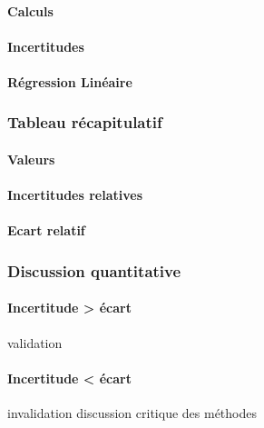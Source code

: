 \paragraph{Calculs}
\paragraph{Incertitudes}
\paragraph{Régression Linéaire}
\newpage

\subsubsection{\large Tableau récapitulatif}
\paragraph{Valeurs}
\paragraph{Incertitudes relatives}
\paragraph{Ecart relatif}

\subsubsection{\large Discussion quantitative}
\paragraph{Incertitude > écart}
validation
\paragraph{Incertitude < écart}
invalidation
discussion critique des méthodes
